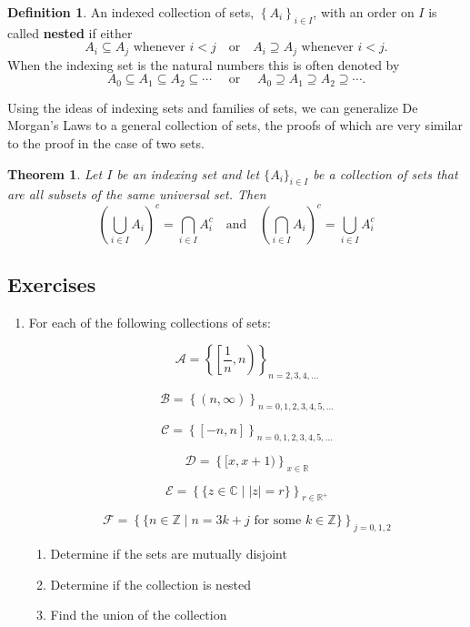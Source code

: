 \documentclass[
]{book}
\providecommand{\tightlist}{%
  \setlength{\itemsep}{0pt}\setlength{\parskip}{0pt}}
\newtheorem{theorem}{Theorem}[chapter]
\theoremstyle{definition}
\newtheorem{definition}{Definition}[chapter]
\theoremstyle{definition}
\theoremstyle{definition}
\theoremstyle{definition}
\theoremstyle{remark}
\begin{document}
\begin{definition}
\protect\hypertarget{def:nested}{}\label{def:nested}An indexed collection of sets, \(\left\{ A_i\right\}_{i\in I}\), with an order on \(I\) is called \textbf{nested} if either
\[A_i \subseteq A_j \mbox{ whenever } i<j \quad \mbox{or} \quad A_i \supseteq A_j \mbox{ whenever } i<j.\]
When the indexing set is the natural numbers this is often denoted by \[A_0 \subseteq A_1 \subseteq A_2 \subseteq \cdots \quad \mbox{ or } \quad A_0 \supseteq A_1 \supseteq A_2 \supseteq \cdots.\]
\end{definition}

Using the ideas of indexing sets and families of sets, we can generalize De Morgan's Laws to a general collection of sets, the proofs of which are very similar to the proof in the case of two sets.

\begin{theorem}
\protect\hypertarget{thm:Generalized-De-Morgans-Laws}{}\label{thm:Generalized-De-Morgans-Laws}Let \(I\) be an indexing set and let \(\{A_i\}_{i\in I}\) be a collection of sets that are all subsets of the same universal set. Then
\[\left( \bigcup_{i\in I} A_i \right)^c = \bigcap_{i \in I} A_i^c \quad \mbox{and} \quad \left( \bigcap_{i\in I} A_i \right)^c = \bigcup_{i \in I} A_i^c\]
\end{theorem}

\hypertarget{exercises-5}{%
\subsection{Exercises}\label{exercises-5}}

\begin{enumerate}
\def\labelenumi{\arabic{enumi}.}
\item
  For each of the following collections of sets:

  \[\displaystyle{\mathcal{A} = \left\{ \left[ \frac{1}{n},n\right) \right\}_{n=2,3,4,\ldots }}\]

  \[\displaystyle{\mathcal{B} = \left\{ \left( n,\infty \right) \right\}_{n=0,1,2,3,4,5,\ldots} }\]

  \[\displaystyle{\mathcal{C} = \left\{ \left[ -n, n \right] \right\}_{n=0,1,2,3,4,5,\ldots }}\]

  \[\displaystyle{\mathcal{D} = \left\{ [x,x+1)\right\}_{x\in \mathbb{R}}}\]

  \[\displaystyle{\mathcal{E} = \left\{ \{z\in \mathbb{C}\middle \vert|z|=r\}\right\}_{r\in \mathbb{R}^+} }\]

  \[\displaystyle{\mathcal{F} = \left\{ \{n\in \mathbb{Z}\middle \vert n=3k+j \mbox{ for some } k\in \mathbb{Z}\}\right\}_{j=0,1,2}}\]

  \begin{enumerate}
  \def\labelenumii{\alph{enumii}.}
  \tightlist
  \item
    Determine if the sets are mutually disjoint
  \item
    Determine if the collection is nested
  \item
    Find the union of the collection
  \end{enumerate}
\end{enumerate}
\end{document}
